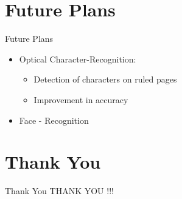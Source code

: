 \documentclass[10pt, a4paper]{beamer}
\begin{document}
\section{Future Plans}
\begin{frame}{Future Plans}
	\begin{itemize}
    	\item Optical Character-Recognition:
        \begin{itemize}
        	\item Detection of characters on ruled pages
            \item Improvement in accuracy
        \end{itemize}
		\item Face - Recognition  
	\end{itemize}
\end{frame}


\section{Thank You}
\begin{frame}{Thank You}
	\centering THANK YOU !!!
\end{frame}
\end{document}
